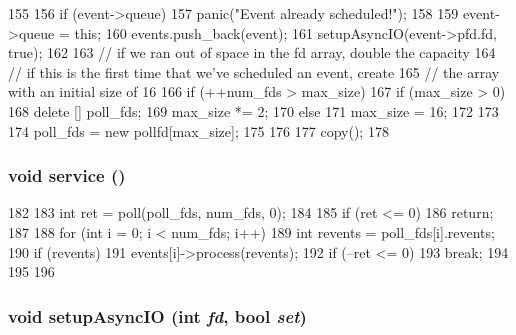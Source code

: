 \begin{DoxyCode}
155 {
156     if (event->queue)
157         panic("Event already scheduled!");
158 
159     event->queue = this;
160     events.push_back(event);
161     setupAsyncIO(event->pfd.fd, true);
162 
163     // if we ran out of space in the fd array, double the capacity
164     // if this is the first time that we've scheduled an event, create
165     // the array with an initial size of 16
166     if (++num_fds > max_size) {
167         if (max_size > 0) {
168             delete [] poll_fds;
169             max_size *= 2;
170         } else {
171             max_size = 16;
172         }
173 
174         poll_fds = new pollfd[max_size];
175     }
176 
177     copy();
178 }
\end{DoxyCode}
\hypertarget{classPollQueue_a365151ef4fcb2b1052b77c2d493399d3}{
\subsubsection[{service}]{\setlength{\rightskip}{0pt plus 5cm}void service ()}}
\label{classPollQueue_a365151ef4fcb2b1052b77c2d493399d3}



\begin{DoxyCode}
182 {
183     int ret = poll(poll_fds, num_fds, 0);
184 
185     if (ret <= 0)
186         return;
187 
188     for (int i = 0; i < num_fds; i++) {
189         int revents = poll_fds[i].revents;
190         if (revents) {
191             events[i]->process(revents);
192             if (--ret <= 0)
193                 break;
194         }
195     }
196 }
\end{DoxyCode}
\hypertarget{classPollQueue_a146cc6e8e860e0fba81d4ed2b58432c7}{
\subsubsection[{setupAsyncIO}]{\setlength{\rightskip}{0pt plus 5cm}void setupAsyncIO (int {\em fd}, \/  bool {\em set})}}
\label{classPollQueue_a146cc6e8e860e0fba81d4ed2b58432c7}




